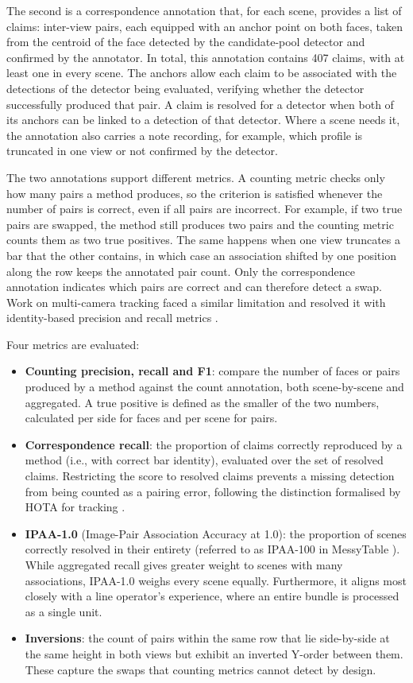\documentclass[a4paper, 12pt, twoside]{book}
\newcommand{\citev}[1]{\citeauthor{#1} \citeyear{#1} \cite{#1}}
\begin{document}
The second is a correspondence annotation that, for each scene, provides a list of claims: inter-view pairs, each equipped with an anchor point on both faces, taken from the centroid of the face detected by the candidate-pool detector and confirmed by the annotator. In total, this annotation contains 407 claims, with at least one in every scene. The anchors allow each claim to be associated with the detections of the detector being evaluated, verifying whether the detector successfully produced that pair. A claim is resolved for a detector when both of its anchors can be linked to a detection of that detector. Where a scene needs it, the annotation also carries a note recording, for example, which profile is truncated in one view or not confirmed by the detector.

The two annotations support different metrics. A counting metric checks only how many pairs a method produces, so the criterion is satisfied whenever the number of pairs is correct, even if all pairs are incorrect. For example, if two true pairs are swapped, the method still produces two pairs and the counting metric counts them as two true positives. The same happens when one view truncates a bar that the other contains, in which case an association shifted by one position along the row keeps the annotated pair count. Only the correspondence annotation indicates which pairs are correct and can therefore detect a swap. Work on multi-camera tracking faced a similar limitation and resolved it with identity-based precision and recall metrics \citev{ristani2016}.

Four metrics are evaluated:

\begin{itemize}
\item \textbf{Counting precision, recall and F1}: compare the number of faces or pairs produced by a method against the count annotation, both scene-by-scene and aggregated. A true positive is defined as the smaller of the two numbers, calculated per side for faces and per scene for pairs.
\item \textbf{Correspondence recall}: the proportion of claims correctly reproduced by a method (i.e., with correct bar identity), evaluated over the set of resolved claims. Restricting the score to resolved claims prevents a missing detection from being counted as a pairing error, following the distinction formalised by HOTA for tracking \citev{luiten2021}.
\item \textbf{IPAA-1.0} (Image-Pair Association Accuracy at 1.0): the proportion of scenes correctly resolved in their entirety (referred to as IPAA-100 in MessyTable \citev{cai2020}). While aggregated recall gives greater weight to scenes with many associations, IPAA-1.0 weighs every scene equally. Furthermore, it aligns most closely with a line operator's experience, where an entire bundle is processed as a single unit.
\item \textbf{Inversions}: the count of pairs within the same row that lie side-by-side at the same height in both views but exhibit an inverted Y-order between them. These capture the swaps that counting metrics cannot detect by design.
\end{itemize}
\end{document}
